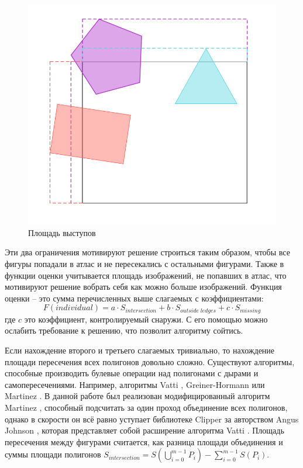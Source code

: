 \documentclass{fefu_thesis/cls/fefu}
\begin{document}
    \begin{figure}[H]
        \centering
        \includegraphics[scale=0.5]{images/ledges.png}
        \caption{Площадь выступов}
    \end{figure}

    Эти два ограничения мотивируют решение строиться таким образом, чтобы все фигуры попадали в атлас и не пересекались с остальными фигурами. Также в функции оценки учитывается площадь изображений, не попавших в атлас, что мотивируют решение вобрать себя как можно больше изображений. Функция оценки -- это сумма перечисленных выше слагаемых с коэффициентами:
    \[
        F\left(individual\right) = a \cdot S_{intersection} + b \cdot S_{outside\;ledges} + c \cdot S_{missing}
    \]
    где $c$ это коэффициент, контролируемый снаружи. С его помощью можно ослабить требование к решению, что позволит алгоритму сойтись.

    Если нахождение второго и третьего слагаемых тривиально, то нахождение площади пересечения всех полигонов довольно сложно. Существуют алгоритмы, способные производить булевые операции над полигонами с дырами и самопересечениями. Например, алгоритмы Vatti \cite{Vatti}, Greiner-Hormann \cite{GreinerHormann} или Martinez \cite{Martinez}. В данной работе был реализован модифицированный алгоритм Martinez \cite{Martinez}, способный подсчитать за один проход объединение всех полигонов, однако в скорости он всё равно уступает библиотеке Clipper за авторством Angus Johnson \cite{Clipper}, которая представляет собой расширение алгоритма Vatti \cite{Vatti}. Площадь пересечения между фигурами считается, как разница площади объединения и суммы площади полигонов $S_{intersection} = S\left(\bigcup\limits_{i = 0}^{m - 1} P_i\right) - \sum\limits_{i = 0}^{m - 1}S\left(P_i\right)$.
\end{document}
